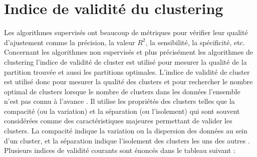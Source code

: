\section{Indice de validité du clustering}
Les algorithmes supervisés ont beaucoup de métriques pour vérifier leur qualité d'ajustement comme la précision, la valeur \(\displaystyle R^{2}\), la sensibilité, la spécificité, etc. Concernant les algorithmes non supervisés et plus précisément les algorithmes de clustering l’indice de validité de cluster est utilisé pour mesurer la qualité de la partition trouvée et aussi les partitions optimales. L’indice de validité de cluster est utilisé donc pour mesurer la qualité des clusters et pour rechercher le nombre optimal de clusters lorsque le nombre de clusters dans les données l'ensemble n'est pas connu à l'avance \cite{rezaee1998new}. Il utilise les propriétés des clusters telles que la compacité (ou la variation) et la séparation (ou l'isolement) qui sont souvent considérées comme des caractéristiques majeures permettant de valider les clusters. La compacité indique la variation ou la dispersion des données au sein d'un cluster, et la séparation indique l'isolement des clusters les uns des autres \cite{ZHANG20081205} . Plusieurs indices de validité courants sont énoncés dans le tableau suivant :
